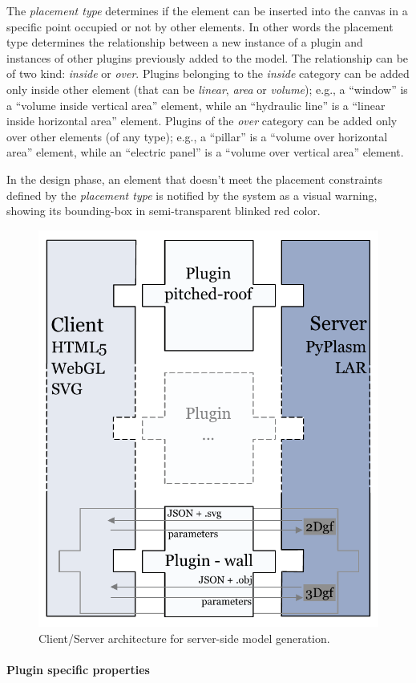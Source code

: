 \documentclass[a4paper,twoside]{article}
\begin{document}
The \emph{placement type} determines if the element can be inserted into the canvas in a specific point occupied or not by other elements. In other words 
the {placement type} determines the relationship between a new instance of a plugin and instances of other plugins previously added to the model. The relationship can be of two kind: \emph{inside} or \emph{over}.
Plugins belonging to the \emph{inside} category can be added only inside other element (that can be \emph{linear}, \emph{area} or \emph{volume}); e.g., a ``window'' is a ``volume inside vertical area'' element,
while an ``hydraulic line'' is a ``linear inside horizontal area'' element.
Plugins of the \emph{over} category can be added only over other elements (of any type);
e.g., a ``pillar'' is a ``volume over horizontal area'' element,
while an ``electric panel'' is a ``volume over vertical area'' element.

In the design phase, an element that doesn't meet the placement constraints defined by the \emph{placement type} is notified by the system as a visual warning, showing its bounding-box in semi-transparent blinked red color.

\begin{figure}[htbp] %
   \centering

   \includegraphics[width=0.6\linewidth]{images/architecture-h}

   \caption{Client/Server architecture for server-side model generation.}
   \label{fig:c-s-arch}
\end{figure}

\paragraph{Plugin specific properties}
\end{document}
